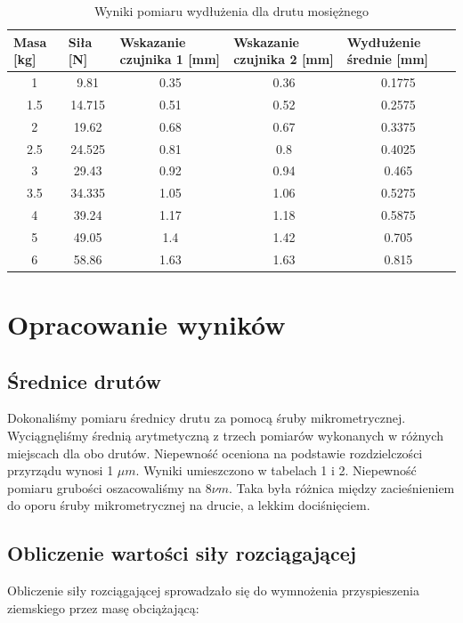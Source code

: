 \documentclass{article}
\begin{document}
\begin{table}[htbp]
\centering
\begin{tabular}{|c|c|c|c|c|}
\hline
\multicolumn{1}{|l|}{Masa [kg]} & \multicolumn{1}{l|}{Siła [N]} & \multicolumn{1}{l|}{Wskazanie czujnika 1 [mm]} & \multicolumn{1}{l|}{Wskazanie czujnika 2 [mm]} & \multicolumn{1}{l|}{Wydłużenie średnie [mm]} \\ \hline
1 & 9.81 & 0.35 & 0.36 & 0.1775 \\ \hline
1.5 & 14.715 & 0.51 & 0.52 & 0.2575 \\ \hline
2 & 19.62 & 0.68 & 0.67 & 0.3375 \\ \hline
2.5 & 24.525 & 0.81 & 0.8 & 0.4025 \\ \hline
3 & 29.43 & 0.92 & 0.94 & 0.465 \\ \hline
3.5 & 34.335 & 1.05 & 1.06 & 0.5275 \\ \hline
4 & 39.24 & 1.17 & 1.18 & 0.5875 \\ \hline
5 & 49.05 & 1.4 & 1.42 & 0.705 \\ \hline
6 & 58.86 & 1.63 & 1.63 & 0.815 \\ \hline
\end{tabular}
\label{}
\caption{Wyniki pomiaru wydłużenia dla drutu mosiężnego}
\end{table}




\section{Opracowanie wyników}
\subsection{Średnice drutów}
Dokonaliśmy pomiaru średnicy drutu za pomocą śruby mikrometrycznej. Wyciągnęliśmy średnią arytmetyczną z trzech pomiarów wykonanych w różnych miejscach dla obo drutów. Niepewność oceniona na podstawie rozdzielczości przyrządu wynosi 1 $\mu m$. Wyniki umieszczono w tabelach 1 i 2.
Niepewność pomiaru grubości oszacowaliśmy na 8$\nu m$. Taka była różnica między zacieśnieniem do oporu śruby mikrometrycznej na drucie, a lekkim dociśnięciem.
\subsection{Obliczenie wartości siły rozciągającej}
Obliczenie siły rozciągającej sprowadzało się do wymnożenia przyspieszenia ziemskiego przez masę obciążającą:
\end{document}
